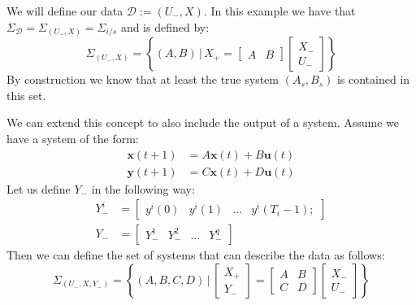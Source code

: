 We will define our data $\mathcal{D} := (U_-, X)$. In this example we have that $\Sigma_\mathcal{D} = \Sigma_{(U_-,X)} = \Sigma_{i/s}$ and is defined by:
\[ \Sigma_{(U_-,X)} = \left\{ (A, B) \, | \, X_{+} = \begin{bmatrix} A & B \end{bmatrix} \begin{bmatrix} X_{-} \\ U_{-} \end{bmatrix} \right\} \]
By construction we know that at least the true system $(A_s,B_s)$ is contained in this set.

We can extend this concept to also include the output of a system. Assume we have a system of the form:
\begin{align}
	\label{isoSystem}
	\mathbf{x}(t+1) &= A \mathbf{x}(t) + B \mathbf{u}(t) \\
	\mathbf{y}(t+1) &= C \mathbf{x}(t) + D \mathbf{u}(t)
\end{align}
Let us define $Y_-$ in the following way:
\begin{align*}
	Y_-^i &= \begin{bmatrix}	y^i(0) & y^i(1)& \dots & y^i(T_i-1); \end{bmatrix}\\
	Y_- &= \begin{bmatrix} Y_-^1 & Y_-^2 & \dots & Y_-^q	\end{bmatrix}
\end{align*}
Then we can define the set of systems that can describe the data as follows:
\begin{equation}
\label{isoSet} 
\Sigma_{(U_-,X, Y_-)} = \left\{ (A, B, C, D) \, | \, 
\begin{bmatrix} X_{+} \\ Y_{-} \end{bmatrix} = 
\begin{bmatrix} A & B \\ C & D \end{bmatrix} 
\begin{bmatrix} X_{-} \\ U_{-} \end{bmatrix} \right\} 
\end{equation}

